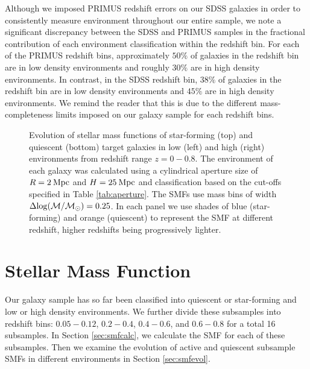 \documentclass{emulateapj}
\begin{document}
Although we imposed PRIMUS redshift errors on our SDSS galaxies in order to consistently measure environment throughout our entire sample, we note a significant discrepancy between the SDSS and PRIMUS samples in the fractional contribution of each environment classification within the redshift bin. For each of the PRIMUS redshift bins, approximately $50 \%$ of galaxies in the redshift bin are in low density environments and roughly $30 \%$ are in high density environments. In contrast, in the SDSS redshift bin, $38 \%$ of galaxies in the redshift bin are in low density environments and $45 \%$ are in high density environments. We remind the reader that this is due to the different mass-completeness limits imposed on our galaxy sample for each redshift bins. 
\begin{figure*}
  \begin{center}
    \leavevmode
     \caption{Evolution of stellar mass functions of star-forming (top) and quiescent (bottom) target galaxies in 
low (left) and high (right) environments from redshift range $z=0-0.8$. The environment of each galaxy  
was calculated using a cylindrical aperture size of $R=2 \: \rm{Mpc}$ and $H=25 \: \rm{Mpc}$ and  
classification based on the cut-offs specified in Table \ref{tab:aperture}. The SMFs use mass bins of 
width $\Delta \rm{log}(\mathcal{M}/\mathcal{M}_{\odot})=0.25$. In each panel we use shades of blue 
(star-forming) and orange (quiescent) to represent the SMF at different redshift, higher redshifts being
progressively lighter.}      \label{fig:smf}
    \end{center}
\end{figure*}
\section{Stellar Mass Function} \label{sec:smf}
Our galaxy sample has so far been classified into quiescent or star-forming and low or high density environments. We further divide these subsamples into redshift bins: $0.05-0.12$, $0.2-0.4$, $0.4-0.6$, and $0.6-0.8$ for a total 16 subsamples. In Section \ref{sec:smfcalc}, we calculate the SMF for each of these subsamples. Then we examine the evolution of active and quiescent subsample SMFs in different environments in Section \ref{sec:smfevol}.  
\end{document}
